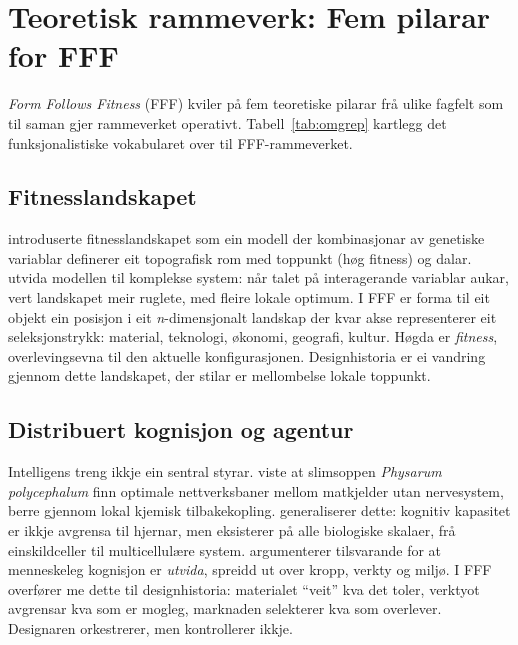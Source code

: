 \documentclass[12pt,a4paper]{article}
\begin{document}
\section{Teoretisk rammeverk: Fem pilarar for FFF}
\label{sec:teori}

\emph{Form Follows Fitness} (FFF) kviler p\aa{} fem teoretiske pilarar fr\aa{} ulike fagfelt som til saman gjer rammeverket operativt. Tabell~\ref{tab:omgrep} kartlegg det funksjonalistiske vokabularet over til FFF-rammeverket.

\subsection{Fitnesslandskapet}

\citet{wright1932} introduserte fitnesslandskapet som ein modell der kombinasjonar av genetiske variablar definerer eit topografisk rom med toppunkt (h\o{}g fitness) og dalar. \citet{kauffman1993} utvida modellen til komplekse system: n\aa{}r talet p\aa{} interagerande variablar aukar, vert landskapet meir ruglete, med fleire lokale optimum. I FFF er forma til eit objekt ein posisjon i eit \emph{n}-dimensjonalt landskap der kvar akse representerer eit seleksjonstrykk: material, teknologi, \o{}konomi, geografi, kultur. H\o{}gda er \emph{fitness}, overlevingsevna til den aktuelle konfigurasjonen. Designhistoria er ei vandring gjennom dette landskapet, der stilar er mellombelse lokale toppunkt.

\subsection{Distribuert kognisjon og agentur}

Intelligens treng ikkje ein sentral styrar. \citet{nakagaki2000} viste at slimsoppen \emph{Physarum polycephalum} finn optimale nettverksbaner mellom matkjelder utan nervesystem, berre gjennom lokal kjemisk tilbakekopling. \citet{levin2019} generaliserer dette: kognitiv kapasitet er ikkje avgrensa til hjernar, men eksisterer p\aa{} alle biologiske skalaer, fr\aa{} einskildceller til multicellu\-l\ae{}re system. \citet{clark2008} argumenterer tilsvarande for at menneskeleg kognisjon er \emph{utvida}, spreidd ut over kropp, verkty og milj\o{}. I FFF overf\o{}rer me dette til designhistoria: materialet \enquote{veit} kva det toler, verktyot avgrensar kva som er mogleg, marknaden selekterer kva som overlever. Designaren orkestrerer, men kontrollerer ikkje.
\end{document}
